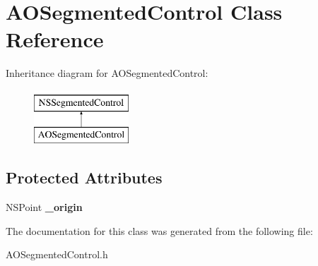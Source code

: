 \hypertarget{interface_a_o_segmented_control}{}\section{A\+O\+Segmented\+Control Class Reference}
\label{interface_a_o_segmented_control}
Inheritance diagram for A\+O\+Segmented\+Control\+:\begin{figure}[H]
\begin{center}
\leavevmode
\includegraphics[height=2.000000cm]{interface_a_o_segmented_control}
\end{center}
\end{figure}
\subsection*{Protected Attributes}
\begin{DoxyCompactItemize}
\item 
\mbox{\label{interface_a_o_segmented_control_a1c4def8485455771926403bef5d8a471}} 
N\+S\+Point {\bfseries \+\_\+origin}
\end{DoxyCompactItemize}


The documentation for this class was generated from the following file\+:\begin{DoxyCompactItemize}
\item 
A\+O\+Segmented\+Control.\+h\end{DoxyCompactItemize}
